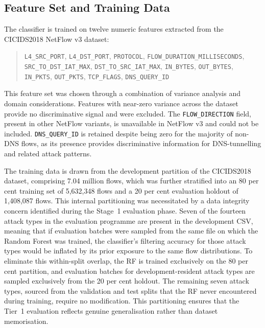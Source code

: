 \documentclass[../main.tex]{subfiles}
\begin{document}
\subsection{Feature Set and Training Data}
\label{sec:feature-set-training}

The classifier is trained on twelve numeric features extracted from the CICIDS2018 NetFlow v3 dataset:

\begin{quote}
\small\raggedright
\texttt{L4\_SRC\_PORT}, \texttt{L4\_DST\_PORT}, \texttt{PROTOCOL},
\texttt{FLOW\_DURATION\_MILLI\-SECONDS},
\texttt{SRC\_TO\_DST\_IAT\_MAX}, \texttt{DST\_TO\_SRC\_IAT\_MAX},
\texttt{IN\_BYTES}, \texttt{OUT\_BYTES}, \texttt{IN\_PKTS},
\texttt{OUT\_PKTS}, \texttt{TCP\_FLAGS}, \texttt{DNS\_QUERY\_ID}
\end{quote}

\noindent This feature set was chosen through a combination of variance analysis and domain considerations. Features with near-zero variance across the dataset provide no discriminative signal and were excluded. The \texttt{FLOW\_DIRECTION} field, present in other NetFlow variants, is unavailable in NetFlow v3 and could not be included. \texttt{DNS\_QUERY\_ID} is retained despite being zero for the majority of non-DNS flows, as its presence provides discriminative information for DNS-tunnelling and related attack patterns.

The training data is drawn from the development partition of the CICIDS2018 dataset, comprising 7.04 million flows, which was further stratified into an 80 per cent training set of 5,632,348 flows and a 20 per cent evaluation holdout of 1,408,087 flows. This internal partitioning was necessitated by a data integrity concern identified during the Stage~1 evaluation phase. Seven of the fourteen attack types in the evaluation programme are present in the development CSV, meaning that if evaluation batches were sampled from the same file on which the Random Forest was trained, the classifier's filtering accuracy for those attack types would be inflated by its prior exposure to the same flow distributions. To eliminate this within-split overlap, the RF is trained exclusively on the 80 per cent partition, and evaluation batches for development-resident attack types are sampled exclusively from the 20 per cent holdout. The remaining seven attack types, sourced from the validation and test splits that the RF never encountered during training, require no modification. This partitioning ensures that the Tier~1 evaluation reflects genuine generalisation rather than dataset memorisation.
\end{document}
